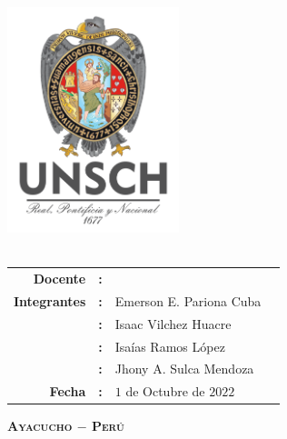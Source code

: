 \thispagestyle{empty}
\phantom{dy}
\begin{center}
	{\Large\scshape\bfseries \dyuniversity}\\
	\vspace{2.5mm}
	{\Large\scshape\bfseries \dyfaculty}\\
	\vspace{2.5mm}
	{\Large\scshape\bfseries \dydept}\\
	\vspace{8mm}
	\includegraphics[width=5cm]{Images/logo/logounsch_a.png}\\
	\vspace{2pt}
	{\Large\bfseries \dycourse}\\
	\vspace{2pt}
	\vspace{0.7cm}{\underline{\Large\bfseries\vphantom{dy}\dytitle}}
	\vspace{5pt}

	\boxabstractd{10cm}{\bfseries\large\centering \dytema}
	\vspace{1cm}
	\begin{center}
		\begin{tabular}{rcll}
			\bf Docente     & \bf: & \dyteacher{}                 & \\[5pt]
			\bf Integrantes & \bf: & Emerson E. Pariona Cuba      & \\[5pt]
			                & \bf: & Isaac Vilchez Huacre         & \\[5pt]
			                & \bf: & Isaías Ramos López           & \\[5pt]
			                & \bf: & Jhony A. Sulca Mendoza       & \\[5pt]
			\bf Fecha       & \bf: & $1$ de Octubre de $2022$ & \\
		\end{tabular}
	\end{center}

	\vfill
	{\Large\scshape\bfseries Ayacucho $-$ Perú}\\
	\vspace{4mm} {\Large\bfseries\dycopyrightyear}
\end{center}

\cleardoublepage{}